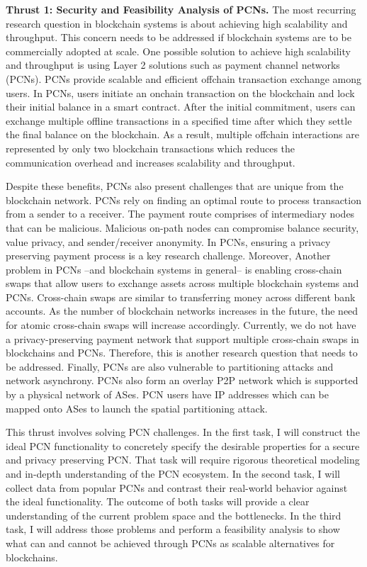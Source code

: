 \documentclass{NSF}
\newcommand{\BfPara}[1]{{\noindent\textbf{#1.}}\xspace}
\begin{document}
\BfPara{Thrust 1: Security and Feasibility Analysis of PCNs} The most recurring research question in blockchain systems is about achieving high scalability and throughput. This concern needs to be addressed if blockchain systems are to be commercially adopted at scale. One possible solution to achieve high scalability and throughput is using Layer 2 solutions such as payment channel networks (PCNs). PCNs provide scalable and efficient offchain transaction exchange among users. In PCNs, users initiate an onchain transaction on the blockchain and lock their initial balance in a smart contract. After the initial commitment, users can exchange multiple offline transactions in a specified time after which they settle the final balance on the blockchain. As a result, multiple offchain interactions are represented by only two blockchain transactions which reduces the communication overhead and increases scalability and throughput. 


Despite these benefits, PCNs also present challenges that are unique from the blockchain network. PCNs rely on finding an optimal route to process transaction from a sender to a receiver. The payment route comprises of intermediary nodes that can be malicious. Malicious on-path nodes can compromise balance security, value privacy, and sender/receiver anonymity. In PCNs, ensuring a privacy preserving payment process is a key research challenge. Moreover, Another problem in PCNs --and blockchain systems in general-- is enabling cross-chain swaps that allow users to exchange assets across multiple blockchain systems and PCNs. Cross-chain swaps are similar to transferring money across different bank accounts. As the number of blockchain networks increases in the future, the need for atomic cross-chain swaps will increase accordingly. Currently, we do not have a privacy-preserving payment network that support multiple cross-chain swaps in blockchains and PCNs. Therefore, this is another research question that needs to be addressed. Finally, PCNs are also vulnerable to partitioning attacks and network asynchrony. PCNs also form an overlay P2P network which is supported by a physical network of ASes. PCN users have IP addresses which can be mapped onto ASes to launch the spatial partitioning attack. 


This thrust involves solving PCN challenges. In the first task, I will construct the ideal PCN functionality to concretely specify the desirable properties for a secure and privacy preserving PCN. That task will require rigorous theoretical modeling and in-depth understanding of the PCN ecosystem. In the second task, I will collect data from popular PCNs and contrast their real-world behavior against the ideal functionality. The outcome of both tasks will provide a clear understanding of the current problem space and the bottlenecks. In the third task, I will address those problems and perform a feasibility analysis to show what can and cannot be achieved through PCNs as scalable alternatives for blockchains. 
\end{document}
